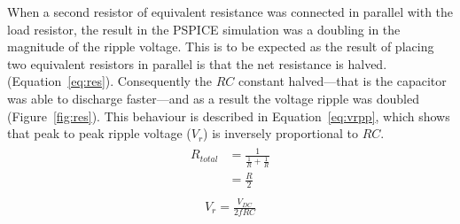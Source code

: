 \documentclass[12pt]{article}
\begin{document}
When a second resistor of equivalent resistance was connected in parallel with the load resistor, the result in the PSPICE simulation was a doubling in the magnitude of the ripple voltage. This is to be expected as the result of placing two equivalent resistors in parallel is that the net resistance is halved. (Equation~\ref{eq:res}). Consequently the $RC$ constant halved---that is the capacitor was able to discharge faster---and as a result the voltage ripple was doubled (Figure~\ref{fig:res}). This behaviour is described in Equation~\ref{eq:vrpp}, which shows that peak to peak ripple voltage ($V_r$) is inversely proportional to $RC$.
\begin{align}
\begin{split}
 R_{total}&=\frac{1}{\frac{1}{R}+\frac{1}{R}}\\
&=\frac{R}{2}
\end{split}
\label{eq:res}
\end{align}
\begin{align}
\begin{split}
V_{r}=\frac{V_{DC}}{2f RC}
\end{split}
\label{eq:vrpp}
\end{align}
\end{document}
